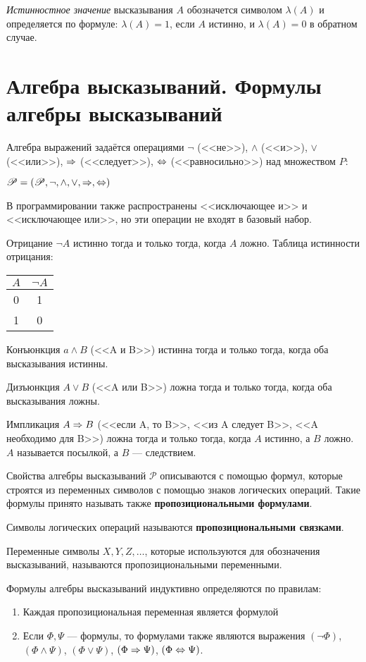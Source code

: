\textit{Истинностное значение} высказывания $A$ обозначется символом $\lambda(A)$ и определяется по формуле:
$\lambda(A) = 1$, если $A$ истинно, и $\lambda(A) = 0$ в обратном случае.

\section{Алгебра высказываний. Формулы алгебры высказываний}
Алгебра выражений задаётся операциями $\lnot$ (<<не>>), $\land$ (<<и>>), $\lor$ (<<или>>), $\Rightarrow$ (<<следует>>), $\Leftrightarrow$ (<<равносильно>>) над множеством $P$:

$\mathscr{P} = (\mathscr{P}, \lnot, \land, \lor, \Rightarrow, \Leftrightarrow)$

В программировании также распространены <<исключающее и>> и <<исключающее или>>, но эти операции не входят в базовый набор.

Отрицание $\lnot A$ истинно тогда и только тогда, когда $A$ ложно. Таблица истинности отрицания:

\begin{tabular}{|c|c|}
    \hline
    $A$ & $\lnot A$ \\
    \hline
    0   &  1        \\
    \hline
    1   &  0        \\
    \hline
\end{tabular}

Конъюнкция $a \land B$ (<<A и B>>) истинна тогда и только тогда, когда оба высказывания истинны.

Дизъюнкция $A \lor B$ (<<A или B>>) ложна тогда и только тогда, когда оба высказывания ложны.

Импликация $A \Rightarrow B$ (<<если A, то B>>, <<из A следует B>>, <<A необходимо для B>>) ложна тогда и только тогда, когда $A$ истинно, а $B$ ложно. $A$ называется посылкой, а $B$ --- следствием.

\dftion Свойства алгебры высказываний $\mathscr{P}$ описываются с помощью формул, которые строятся из переменных символов с помощью знаков логических операций. Такие формулы принято называть также \textbf{пропозициональными формулами}.

\dftion Символы логических операций называются \textbf{пропозициональными связками}.

Переменные символы $X, Y, Z, \dots$, которые используются для обозначения высказываний, называются пропозициональными переменными.

\dftion Формулы алгебры высказываний индуктивно определяются по правилам:
\begin{enumerate}
    \item Каждая пропозициональная переменная является формулой
    \item Если $\Phi, \Psi$ --- формулы, то формулами также являются выражения $(\lnot \Phi)$, $(\Phi \land \Psi)$, $(\Phi \lor \Psi)$, $(\Phi \Rightarrow \Psi)$, $(\Phi \Leftrightarrow \Psi)$.
\end{enumerate}

